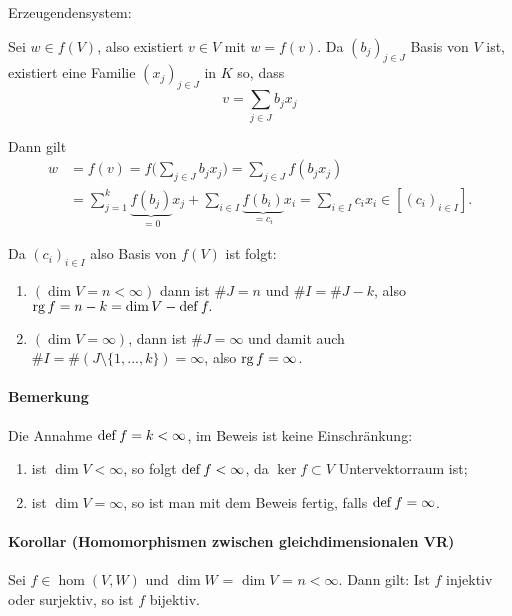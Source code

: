  		Erzeugendensystem:
 		\begin{addmargin}[25pt]{0pt}
 			Sei $w\in f(V)$, also existiert $v\in V$ mit $w = f(v)$. Da $(b_j)_{j\in J}$ Basis von $V$ ist, existiert eine Familie $(x_j)_{j\in J}$ in $K$ so, dass
 			\begin{equation*}
 				v = \sum_{j\in J} b_jx_j
 			\end{equation*}

 			Dann gilt
 			\begin{align*}
 				w & = f(v) = f\Big(\sum_{j\in J} b_jx_j\Big) = \sum_{j\in J}f(b_jx_j)                                                                  \\
 				  & = \sum_{j=1}^{k}\underbrace{f(b_j)}_{=0}x_j + \sum_{i\in I}\underbrace{f(b_i)}_{=c_i}x_i = \sum_{i\in I}c_ix_i\in[(c_i)_{i\in I}].
 			\end{align*}
 		\end{addmargin}

 		Da $(c_i)_{i\in I}$ also Basis von $f(V)$ ist folgt:
 		\begin{enumerate}[1.{ Fall:}]
 			\item $(\dim V = n<\infty)$ dann ist $\# J = n$ und $\# I = \# J-k$, also $\operatorname{rg} f = n-k = \dim V - \operatorname{def} f.$
 			\item $(\dim V = \infty)$, dann ist $\# J = \infty $ und damit auch $\#I =\#(J\setminus \{{1,...,k\}})=\infty $, also $\operatorname{rg} f= \infty$.
 		\end{enumerate}

 	\paragraph{Bemerkung}
 		Die Annahme $\operatorname{def} f = k<\infty$, im Beweis ist keine Einschränkung:
 		\begin{enumerate}
 			\item ist $\dim V < \infty$, so folgt $\operatorname{def} f<\infty$, da $\ker f\subset V$ Untervektorraum ist;
 			\item ist $\dim V = \infty$, so ist man mit dem Beweis fertig, falls $\operatorname{def} f = \infty$.
 		\end{enumerate}

 	\paragraph{Korollar (Homomorphismen zwischen gleichdimensionalen VR)}
 		\begin{Korollar}
 			Sei $f\in \hom(V,W)$ und $\dim W$ = $\dim V$ = $n<\infty$.
 			Dann gilt: Ist $f$ injektiv oder surjektiv, so ist $f$ bijektiv.
 		\end{Korollar}

